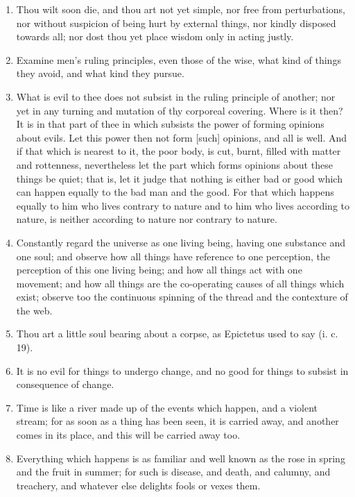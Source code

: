 \begin{enumerate}
\item Thou wilt soon die, and thou art not yet simple, nor free from perturbations, nor without suspicion of being hurt by external things, nor kindly disposed towards all; nor dost thou yet place wisdom only in acting justly.

\item Examine men's ruling principles, even those of the wise, what kind of things they avoid, and what kind they pursue.

\item What is evil to thee does not subsist in the ruling principle of another; nor yet in any turning and mutation of thy corporeal covering. Where is it then? It is in that part of thee in which subsists the power of forming opinions about evils. Let this power then not form [{\clarify such}] opinions, and all is well. And if that which is nearest to it, the poor body, is cut, burnt, filled with matter and rottenness, nevertheless let the part which forms opinions about these things be quiet; that is, let it judge that nothing is either bad or good which can happen equally to the bad man and the good. For that which happens equally to him who lives contrary to nature and to him who lives according to nature, is neither according to nature nor contrary to nature.

\item Constantly regard the universe as one living being, having one substance and one soul; and observe how all things have reference to one perception, the perception of this one living being; and how all things act with one movement; and how all things are the co-operating causes of all things which exist; observe too the continuous spinning of the thread and the contexture of the web.

\item Thou art a little soul bearing about a corpse, as Epictetus used to say (i. c. 19).

\item It is no evil for things to undergo change, and no good for things to subsist in consequence of change.

\item Time is like a river made up of the events which happen, and a violent stream; for as soon as a thing has been seen, it is carried away, and another comes in its place, and this will be carried away too.

\item Everything which happens is as familiar and well known as the rose in spring and the fruit in summer; for such is disease, and death, and calumny, and treachery, and whatever else delights fools or vexes them.


\end{enumerate}
